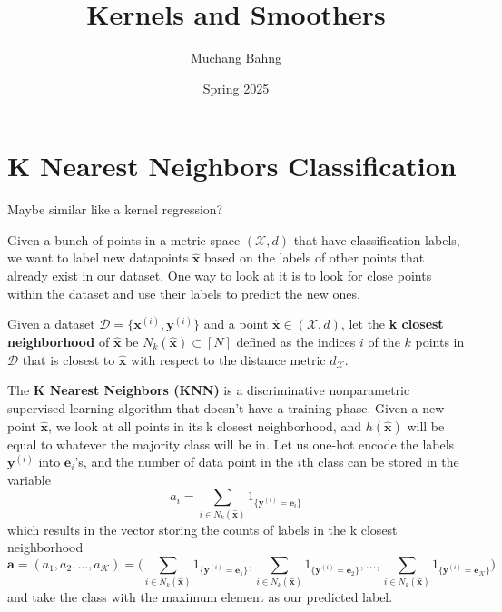 \documentclass{article}
\begin{document}
\title{Kernels and Smoothers}
\author{Muchang Bahng}
\date{Spring 2025}

\maketitle
\tableofcontents
\pagebreak

\section{K Nearest Neighbors Classification} 

  \begin{question}[To Do]
    Maybe similar like a kernel regression?  
  \end{question}

  Given a bunch of points in a metric space $(\mathcal{X}, d)$ that have classification labels, we want to label new datapoints $\hat{\mathbf{x}}$ based on the labels of other points that already exist in our dataset. One way to look at it is to look for close points within the dataset and use their labels to predict the new ones. 

  \begin{definition}
    Given a dataset $\mathcal{D} = \{\mathbf{x}^{(i)}, \mathbf{y}^{(i)}\}$ and a point $\hat{\mathbf{x}} \in (\mathcal{X}, d)$, let the \textbf{k closest neighborhood} of $\hat{\mathbf{x}}$ be $N_k (\hat{\mathbf{x}}) \subset [N]$ defined as the indices $i$ of the $k$ points in $\mathcal{D}$ that is closest to $\hat{\mathbf{x}}$ with respect to the distance metric $d_\mathcal{X}$. 
  \end{definition}

  \begin{definition}
    The \textbf{K Nearest Neighbors (KNN)} is a discriminative nonparametric supervised learning algorithm that doesn't have a training phase. Given a new point $\hat{\mathbf{x}}$, we look at all points in its k closest neighborhood, and $h(\hat{\mathbf{x}})$ will be equal to whatever the majority class will be in. Let us one-hot encode the labels $\mathbf{y}^{(i)}$ into $\mathbf{e}_i$'s, and the number of data point in the $i$th class can be stored in the variable 
    \begin{equation}
      a_i = \sum_{i \in N_k (\hat{\mathbf{x}})} 1_{\{\mathbf{y}^{(i)} = \mathbf{e}_i\}}
    \end{equation}
    which results in the vector storing the counts of labels in the k closest neighborhood 
    \begin{equation}
      \mathbf{a} = (a_1, a_2, \ldots, a_\mathcal{K}) = \bigg( \sum_{i \in N_k (\hat{\mathbf{x}})} 1_{\{\mathbf{y}^{(i)} = \mathbf{e}_1\}}, \sum_{i \in N_k (\hat{\mathbf{x}})} 1_{\{\mathbf{y}^{(i)} = \mathbf{e}_2\}}, \ldots, \sum_{i \in N_k (\hat{\mathbf{x}})} 1_{\{\mathbf{y}^{(i)} = \mathbf{e}_\mathcal{K}\}} \bigg) 
    \end{equation}
    and take the class with the maximum element as our predicted label. 
  \end{definition}
\end{document}
